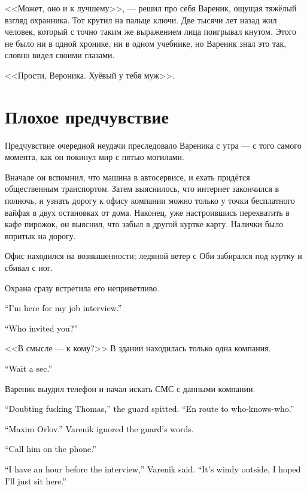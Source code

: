\documentclass[a4paper,10pt,fleqn]{book}\usepackage{polyglossia}\setdefaultlanguage{english}\setotherlanguage{russian}\defaultfontfeatures{Ligatures=TeX,Mapping=tex-text} \usepackage{xcolor}\definecolor{lightgray}{HTML}{bbbbbb}\color{lightgray}\newcommand{\ml}[3]{\textcolor{black}{#3}}
\begin{document}
<<Может, оно и к лучшему>>, --- решил про себя Вареник, ощущая тяжёлый взгляд охранника.
Тот крутил на пальце ключи.
Две тысячи лет назад жил человек, который с точно таким же выражением лица поигрывал кнутом.
Этого не было ни в одной хронике, ни в одном учебнике, но Вареник знал это так, словно видел своими глазами.

<<Прости, Вероника.
Хуёвый у тебя муж>>.

\section{Плохое предчувствие}

Предчувствие очередной неудачи преследовало Вареника с утра --- с того самого момента, как он покинул мир с пятью могилами.

Вначале он вспомнил, что машина в автосервисе, и ехать придётся общественным транспортом.
Затем выяснилось, что интернет закончился в полночь, и узнать дорогу к офису компании можно только у точки бесплатного вайфая в двух остановках от дома.
Наконец, уже настроившись перехватить в кафе пирожок, он выяснил, что забыл в другой куртке карту.
Налички было впритык на дорогу.

Офис находился на возвышенности;
ледяной ветер с Оби забирался под куртку и сбивал с ног.

Охрана сразу встретила его неприветливо.

\ml{$0$}
{--- Я на собеседование.}
{``I'm here for my job interview.''}

\ml{$0$}
{--- К кому?}
{``Who invited you?''}

<<В смысле --- к кому?>>
В здании находилась только одна компания.

\ml{$0$}
{--- Щас.}
{``Wait a sec.''}

Вареник выудил телефон и начал искать СМС с данными компании.

\ml{$0$}
{--- Фома Непомнящий, блядь, --- плюнул охранник.}
{``Doubting fucking Thomas,'' the guard spitted.}
\ml{$0$}
{--- Идёт, а к кому --- не помнит.}
{``En route to who-knows-who.''}

\ml{$0$}
{--- Максим Орлов, --- сказал Вареник, проигнорировав реплику.}
{``Maxim Orlov.'' Varenik ignored the guard's words.}

\ml{$0$}
{--- Ну так и звоните ему.}
{``Call him on the phone.''}

\ml{$0$}
{--- До собеседования ещё час, --- сказал Вареник.}
{``I have an hour before the interview,'' Varenik said.}
\ml{$0$}
{--- На улице ветрено, и я думал, просто посижу здесь.}
{``It's windy outside, I hoped I'll just sit here.''}
\end{document}
